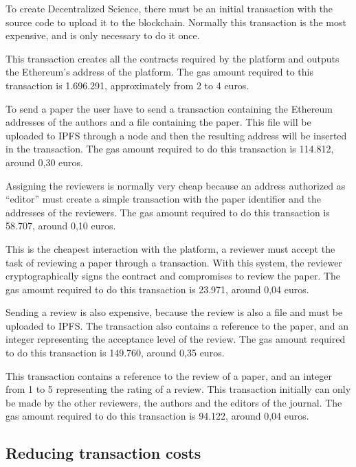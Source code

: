 \begin{itemize}
   To create Decentralized Science, there must be an
  initial transaction with the source code to upload it to the blockchain.
  Normally this transaction is the most expensive, and is only necessary to do
  it once.

  This transaction creates all the contracts required by the platform and
  outputs the Ethereum's address of the platform. The gas amount required to
  this transaction is 1.696.291, approximately from 2 to 4 euros.

   To send a paper the user have to send a transaction
  containing the Ethereum addresses of the authors and a file containing the
  paper. This file will be uploaded to IPFS through a node and then the
  resulting address will be inserted in the transaction. The gas amount required
  to do this transaction is 114.812, around 0,30 euros.

   Assigning the reviewers is normally very cheap
  because an address authorized as ``editor'' must create a simple transaction
  with the paper identifier and the addresses of the reviewers. The gas amount
  required to do this transaction is 58.707, around 0,10 euros.

   This is the cheapest interaction with the platform, a
  reviewer must accept the task of reviewing a paper through a transaction. With
  this system, the reviewer cryptographically signs the contract and compromises
  to review the paper. The gas amount required to do this transaction is 23.971,
  around 0,04 euros.

   Sending a review is also expensive, because the review is
  also a file and must be uploaded to IPFS. The transaction also contains a
  reference to the paper, and an integer representing the acceptance level of
  the review. The gas amount required to do this transaction is 149.760, around
  0,35 euros.

   This transaction contains a reference to the review of a
  paper, and an integer from 1 to 5 representing the rating of a review. This
  transaction initially can only be made by the other reviewers, the authors and
  the editors of the journal. The gas amount required to do this transaction is
  94.122, around 0,04 euros.

\end{itemize}

\subsection{Reducing transaction costs}
\label{sec:reduc-trans-costs}

